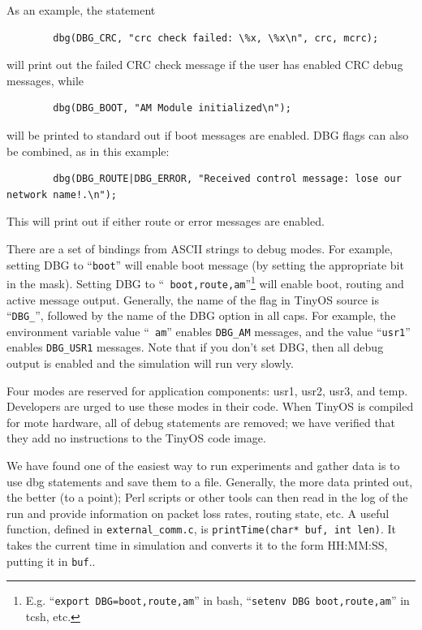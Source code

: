 \documentclass[10pt,fleqn]{article}
\begin{document}
As an example, the statement

\scriptsize
\begin{verbatim}
        dbg(DBG_CRC, "crc check failed: \%x, \%x\n", crc, mcrc);
\end{verbatim}
\normalsize

\noindent will print out the failed CRC check message if the user has enabled
CRC debug messages, while

\scriptsize
\begin{verbatim}
        dbg(DBG_BOOT, "AM Module initialized\n");
\end{verbatim}
\normalsize

\noindent will be printed to standard out if boot messages are enabled. DBG
flags can also be combined, as in this example:

\scriptsize
\begin{verbatim}
        dbg(DBG_ROUTE|DBG_ERROR, "Received control message: lose our network name!.\n");
\end{verbatim}
\normalsize

\noindent This will print out if either route or error messages are enabled.

There are a set of bindings from ASCII strings to debug modes. For
example, setting DBG to ``{\tt boot}'' will enable boot message (by
setting the appropriate bit in the mask). Setting DBG to ``{\tt
boot,route,am}''\footnote{E.g. ``{\tt export DBG=boot,route,am}'' in bash,
``{\tt setenv DBG boot,route,am}'' in tcsh, etc.} will enable boot,
routing and active message output. Generally, the name of the flag in
TinyOS source is ``{\tt DBG\_}'', followed by the name of the DBG
option in all caps. For example, the environment variable value ``{\tt
am}'' enables {\tt DBG\_AM} messages, and the value ``{\tt usr1}''
enables {\tt DBG\_USR1} messages. Note that if you don't set DBG, then all
debug output is enabled and the simulation will run very slowly.

Four modes are reserved for application components: usr1, usr2, usr3,
and temp. Developers are urged to use these modes in their code. When
TinyOS is compiled for mote hardware, all of debug statements are
removed; we have verified that they add no instructions to the TinyOS
code image.

We have found one of the easiest way to run experiments and gather
data is to use dbg statements and save them to a file. Generally, the
more data printed out, the better (to a point); Perl scripts or other
tools can then read in the log of the run and provide information on
packet loss rates, routing state, etc. A useful function, defined in
{\tt external\_comm.c}, is {\tt printTime(char* buf, int len)}. It
takes the current time in simulation and converts it to the form
HH:MM:SS, putting it in {\tt buf}..
\end{document}
